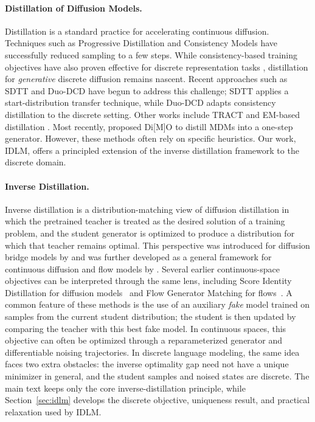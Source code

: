 \paragraph{Distillation of Diffusion Models.}
Distillation is a standard practice for accelerating continuous diffusion. Techniques such as Progressive Distillation \citep{salimans2022progressive} and Consistency Models
\citep{song2023consistency, kim2023consistency} have successfully reduced sampling to a few steps.
While consistency-based training objectives have also proven effective for discrete representation tasks \citep{consistency2024rep}, distillation for \textit{generative} discrete diffusion remains nascent.
Recent approaches such as SDTT \citep{deschenaux2024beyond} and Duo-DCD \citep{sahoo2025the} have begun to address this challenge; SDTT applies a start-distribution transfer technique, while Duo-DCD adapts consistency distillation to the discrete setting. Other works include TRACT \citep{berthelot2023tract} and EM-based distillation \citep{xie2024distillation}. Most recently, \citet{zhu_dimathttmo_2025} proposed Di[M]O to distill MDMs into a one-step generator. However, these methods often rely on specific heuristics. Our work, IDLM, offers a principled extension of the inverse distillation framework \citep{gushchin2025inverse, kornilov2025universal} to the discrete domain.

\paragraph{Inverse Distillation.}
Inverse distillation is a distribution-matching view of diffusion distillation in which the pretrained teacher is treated as the desired solution of a training problem, and the student generator is optimized to produce a distribution for which that teacher remains optimal. This perspective was introduced for diffusion bridge models by \citet{gushchin2025inverse} and was further developed as a general framework for continuous diffusion and flow models by \citet{kornilov2025universal}. Several earlier continuous-space objectives can be interpreted through the same lens, including Score Identity Distillation for diffusion models~\citep{zhou2024score,zhou2024adversarial} and Flow Generator Matching for flows~\citep{huang2024flow}. A common feature of these methods is the use of an auxiliary \emph{fake} model trained on samples from the current student distribution; the student is then updated by comparing the teacher with this best fake model. In continuous spaces, this objective can often be optimized through a reparameterized generator and differentiable noising trajectories. In discrete language modeling, the same idea faces two extra obstacles: the inverse optimality gap need not have a unique minimizer in general, and the student samples and noised states are discrete. The main text keeps only the core inverse-distillation principle, while Section~\ref{sec:idlm} develops the discrete objective, uniqueness result, and practical relaxation used by IDLM.
